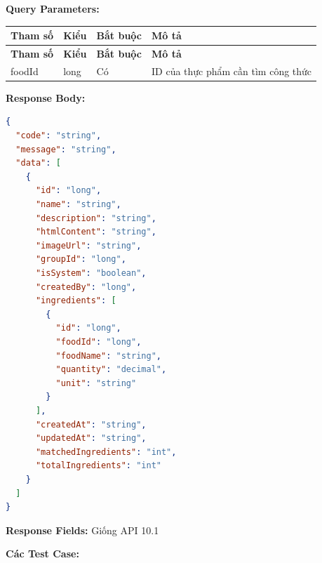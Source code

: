 \textbf{Query Parameters:}

\begin{longtable}{|p{}|p{}|p{}|p{}|}
\hline
\textbf{Tham số} & \textbf{Kiểu} & \textbf{Bắt buộc} & \textbf{Mô tả} \\
\hline
\endfirsthead

\hline
\textbf{Tham số} & \textbf{Kiểu} & \textbf{Bắt buộc} & \textbf{Mô tả} \\
\hline
\endhead

\hline
\endfoot

foodId & long & Có & ID của thực phẩm cần tìm công thức \\
\hline
\end{longtable}

\textbf{Response Body:}

\begin{lstlisting}[language=json]
{
  "code": "string",
  "message": "string",
  "data": [
    {
      "id": "long",
      "name": "string",
      "description": "string",
      "htmlContent": "string",
      "imageUrl": "string",
      "groupId": "long",
      "isSystem": "boolean",
      "createdBy": "long",
      "ingredients": [
        {
          "id": "long",
          "foodId": "long",
          "foodName": "string",
          "quantity": "decimal",
          "unit": "string"
        }
      ],
      "createdAt": "string",
      "updatedAt": "string",
      "matchedIngredients": "int",
      "totalIngredients": "int"
    }
  ]
}
\end{lstlisting}

\textbf{Response Fields:} Giống API 10.1

\textbf{Các Test Case:}

